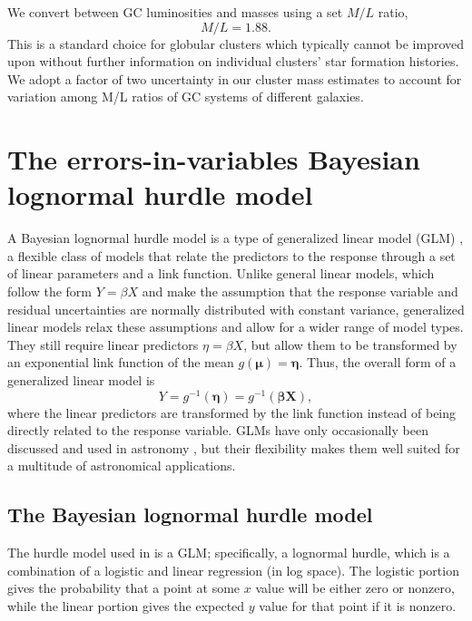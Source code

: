 \documentclass[twocolumn]{aastex631}
\begin{document}
We convert between GC luminosities and masses using a set $M/L$ ratio,
\begin{equation}
   M/L = 1.88. 
\end{equation}
This is a standard choice for globular clusters \citep[e.g.][]{McLaughlin2005, Georgiev2010, Forbes2018} which typically cannot be improved upon without further information on individual clusters' star formation histories. We adopt a factor of two uncertainty in our cluster mass estimates to account for variation among M/L ratios of GC systems of different galaxies.

\section{The errors-in-variables Bayesian lognormal hurdle model} \label{sec:hurdle}

A Bayesian lognormal hurdle model is a type of generalized linear model (GLM) \citep{Nelder1972, McCullaugh1983}, a flexible class of models that relate the predictors to the response through a set of linear parameters and a link function. Unlike general linear models, which follow the form \boldmath$Y=\beta X$ \unboldmath and make the assumption that the response variable and residual uncertainties are normally distributed with constant variance, generalized linear models relax these assumptions and allow for a wider range of model types. They still require linear predictors \boldmath$\eta=\beta X$\unboldmath, but allow them to be transformed by an exponential link function of the mean $g(\boldsymbol\mu)=\boldsymbol\eta$. Thus, the overall form of a generalized linear model is 
\begin{equation} 
    Y = g^{-1}(\boldsymbol\eta)=g^{-1}(\boldsymbol\beta\mathbf{X}),
\end{equation}
where the linear predictors are transformed by the link function instead of being directly related to the response variable. GLMs have only occasionally been discussed and used in astronomy \citep[see][for an introduction of their use in the field]{deSouza2015, Elliot2015, deSouza2015B, hilbe2017, Hattab2019}, but their flexibility makes them well suited for a multitude of astronomical applications. 

\subsection{The Bayesian lognormal hurdle model}

The hurdle model used in  is a GLM; specifically, a lognormal hurdle, which is a combination of a logistic and linear regression (in log space). The logistic portion gives the probability that a point at some $x$ value will be either zero or nonzero, while the linear portion gives the expected $y$ value for that point if it is nonzero. 
\end{document}
